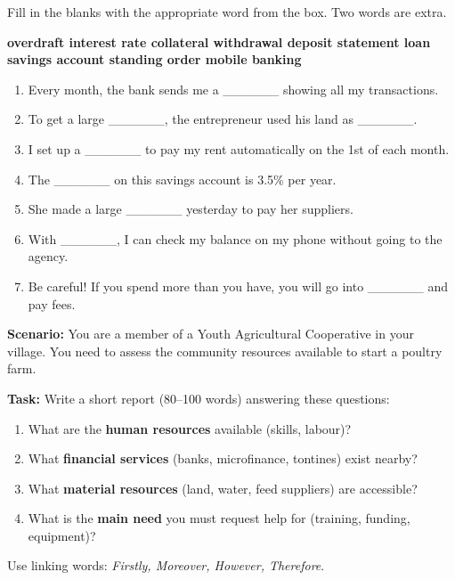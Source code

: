 \documentclass[11pt]{article}
\begin{document}
\begin{exercice}
Fill in the blanks with the appropriate word from the box. Two words are extra.

\begin{center}
\textbf{overdraft \quad interest rate \quad collateral \quad withdrawal \quad deposit \quad statement \quad loan \quad savings account \quad standing order \quad mobile banking}
\end{center}

\begin{enumerate}
    \item Every month, the bank sends me a \_\_\_\_\_\_ showing all my transactions.
    \item To get a large \_\_\_\_\_\_, the entrepreneur used his land as \_\_\_\_\_\_.
    \item I set up a \_\_\_\_\_\_ to pay my rent automatically on the 1st of each month.
    \item The \_\_\_\_\_\_ on this savings account is 3.5\% per year.
    \item She made a large \_\_\_\_\_\_ yesterday to pay her suppliers.
    \item With \_\_\_\_\_\_, I can check my balance on my phone without going to the agency.
    \item Be careful! If you spend more than you have, you will go into \_\_\_\_\_\_ and pay fees.
\end{enumerate}
\end{exercice}

\begin{exercice}
\textbf{Scenario:} You are a member of a Youth Agricultural Cooperative in your village. You need to assess the community resources available to start a poultry farm.

\textbf{Task:} Write a short report (80--100 words) answering these questions:
\begin{enumerate}
    \item What are the \textbf{human resources} available (skills, labour)?
    \item What \textbf{financial services} (banks, microfinance, tontines) exist nearby?
    \item What \textbf{material resources} (land, water, feed suppliers) are accessible?
    \item What is the \textbf{main need} you must request help for (training, funding, equipment)?
\end{enumerate}
Use linking words: \emph{Firstly, Moreover, However, Therefore}.
\end{exercice}
\end{document}
